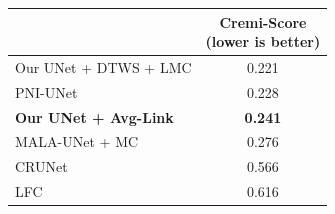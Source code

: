 \begin{figure}[t]
\begin{minipage}[t]{0.56\textwidth}
\begin{tabular}[t]{l|l|c}
        \end{tabular}
    \label{tab:results_cremi_train}
\end{minipage}\hfill
\begin{minipage}[t]{0.4\textwidth}
    \centering
    \scriptsize
        \begin{tabular}[t]{l|c}
         & \makecell{Cremi-Score \\(lower is better)}  \\ \midrule
Our UNet + DTWS + LMC &  0.221\\
PNI-UNet \cite{lee2017superhuman} & 0.228 \\
\textbf{Our UNet + \algname{} Avg-Link} & \textbf{0.241} \\
MALA-UNet + MC \cite{funke2018large} & 0.276 \\
CRUNet \cite{zeng2017deepem3d} & 0.566  \\
LFC \cite{parag2017anisotropic} & 0.616  \\
        \end{tabular}
        \vspace*{1.1em}
    \label{tab:results_cremi_test}
\end{minipage}
\end{figure}
\captionsetup[subfigure]{justification=centering, singlelinecheck=off}
